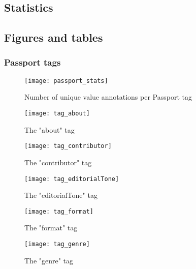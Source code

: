 \subsection{Statistics}

\subsection{Figures and tables}

\subsubsection{Passport tags}


\begin{figure}[h]
  \centering
  \texttt{[image: passport\_stats]}
  \caption{Number of unique value annotations per Passport tag}
  \label{fig:passport_stats}
\end{figure}

\begin{figure}[h]
  \centering
  \texttt{[image: tag\_about]}
  \caption{The "about" tag}
  \label{fig:tag_about}
\end{figure}

\begin{figure}[h]
  \centering
  \texttt{[image: tag\_contributor]}
  \caption{The "contributor" tag}
  \label{fig:tag_contributor}
\end{figure}

\begin{figure}[h]
  \centering
  \texttt{[image: tag\_editorialTone]}
  \caption{The "editorialTone" tag}
  \label{fig:tag_editorialTone}
\end{figure}

\begin{figure}[h]
  \centering
  \texttt{[image: tag\_format]}
  \caption{The "format" tag}
  \label{fig:tag_format}
\end{figure}

\begin{figure}[h]
  \centering
  \texttt{[image: tag\_genre]}
  \caption{The "genre" tag}
  \label{fig:tag_genre}
\end{figure}

